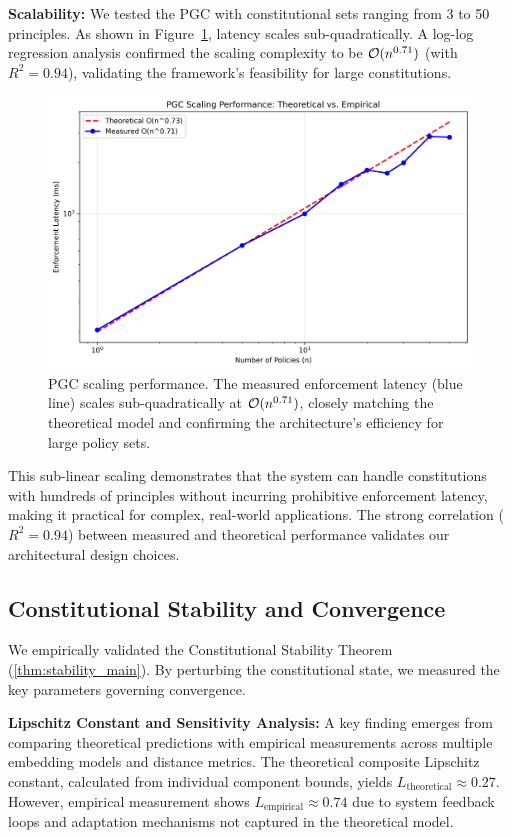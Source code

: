 \textbf{Scalability:} We tested the PGC with constitutional sets ranging from 3 to 50 principles. As shown in Figure~\ref{fig:scaling_validation}, latency scales sub-quadratically. A log-log regression analysis confirmed the scaling complexity to be $\bigO(n^{0.71})$ (with $R^2 = 0.94$), validating the framework's feasibility for large constitutions.

\begin{figure}[H]
    \centering
    \includegraphics[width=\linewidth]{scaling_validation.png}
    \caption{PGC scaling performance. The measured enforcement latency (blue line) scales sub-quadratically at $\bigO(n^{0.71})$, closely matching the theoretical model and confirming the architecture's efficiency for large policy sets.}\label{fig:scaling_validation}
\end{figure}

This sub-linear scaling demonstrates that the system can handle constitutions with hundreds of principles without incurring prohibitive enforcement latency, making it practical for complex, real-world applications. The strong correlation ($R^2 = 0.94$) between measured and theoretical performance validates our architectural design choices.

\subsection{Constitutional Stability and Convergence}
We empirically validated the Constitutional Stability Theorem (\ref{thm:stability_main}). By perturbing the constitutional state, we measured the key parameters governing convergence.

\textbf{Lipschitz Constant and Sensitivity Analysis:} A key finding emerges from comparing theoretical predictions with empirical measurements across multiple embedding models and distance metrics. The theoretical composite Lipschitz constant, calculated from individual component bounds, yields $L_{\text{theoretical}} \approx 0.27$. However, empirical measurement shows $L_{\text{empirical}} \approx 0.74$ due to system feedback loops and adaptation mechanisms not captured in the theoretical model.

